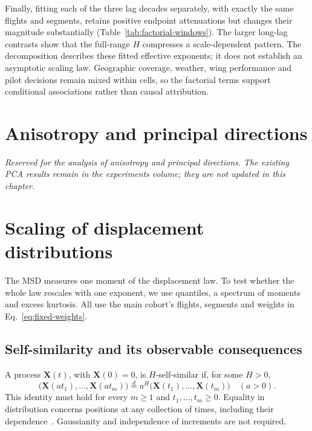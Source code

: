 Finally, fitting each of the three lag decades separately, with exactly the
same flights and segments, retains positive endpoint attenuations but changes
their magnitude substantially (Table~\ref{tab:factorial-windows}). The larger
long-lag contrasts show that the full-range $H$ compresses a scale-dependent
pattern. The decomposition describes these fitted effective exponents; it does
not establish an asymptotic scaling law. Geographic coverage, weather, wing
performance and pilot decisions remain mixed within cells, so the factorial
terms support conditional associations rather than causal attribution.

\begin{table}[htbp]
 \centering\small
 
 \caption{Experimental fit-window sensitivity, keeping $\mathcal C_{10000}$
 and its retained segments fixed. All entries are point estimates; RMS denotes
 $R_{\rm rms}$. The endpoint interaction contrasts $D_{\rm B}$ and $D_{\rm E}$
 are defined after Eq.~\eqref{eq:factorial-simple}.}
 \label{tab:factorial-windows}
\end{table}
\FloatBarrier

\section{Anisotropy and principal directions}
\label{sec:fixed-anisotropy}
\emph{Reserved for the analysis of anisotropy and principal directions. The existing
PCA results remain in the experiments volume; they are not updated in this chapter.}

\section{Scaling of displacement distributions}
\label{sec:fixed-scaling}

The MSD measures one moment of the displacement law. To test whether the whole law
rescales with one exponent, we use quantiles, a spectrum of moments and excess kurtosis.
All use the main cohort's flights, segments and weights in Eq.~\eqref{eq:fixed-weights}.

\subsection{Self-similarity and its observable consequences}
\label{sec:fixed-selfsimilar-definition}

A process $\boldsymbol X(t)$, with $\boldsymbol X(0)=0$, is $H$-self-similar if,
for some $H>0$,
\begin{equation}
 \bigl(\boldsymbol X(at_1),\ldots,\boldsymbol X(at_m)\bigr)
 \overset d= a^H\bigl(\boldsymbol X(t_1),\ldots,\boldsymbol X(t_m)\bigr)
 \quad(a>0).
 \label{eq:fixed-selfsimilar}
\end{equation}
This identity must hold for every $m\geq1$ and $t_1,\ldots,t_m\geq0$.
Equality in distribution concerns positions at any collection of times, including
their dependence~\cite{embrechts_maejima_selfsimilar}. Gaussianity and independence
of increments are not required.

